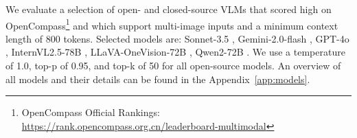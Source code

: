 We evaluate a selection of open- and closed-source VLMs that scored high on OpenCompass\footnote{OpenCompass Official Rankings: \\ \href{https://rank.opencompass.org.cn/leaderboard-multimodal}{https://rank.opencompass.org.cn/leaderboard-multimodal}} and which support multi-image inputs and a minimum context length of 800 tokens. Selected models are: Sonnet-3.5 \cite{claudesonnet35}, Gemini-2.0-flash \cite{gemini20flash}, GPT-4o \cite{gpt4o}, InternVL2.5-78B \cite{chen2024expanding}, LLaVA-OneVision-72B \cite{li2024llava}, Qwen2-72B \cite{Qwen2VL}. We use a temperature of 1.0, top-p of 0.95, and top-k of 50 for all open-source models. An overview of all models and their details can be found in the Appendix~\ref{app:models}.


